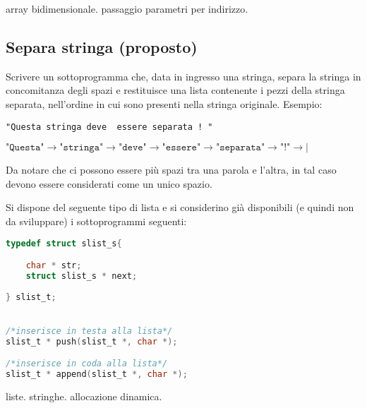 \begin{tags}
array bidimensionale. passaggio parametri per indirizzo.
\end{tags}



\subsection{Separa stringa (proposto)}

Scrivere un sottoprogramma che, data in ingresso una stringa, separa la stringa in concomitanza degli spazi e restituisce una lista contenente i pezzi della stringa separata, nell'ordine in cui sono presenti nella stringa originale.
Esempio: 
\begin{verbatim}
"Questa stringa deve  essere separata ! "
\end{verbatim}

$\texttt{"Questa"} \rightarrow \texttt{"stringa"} \rightarrow \texttt{"deve"} \rightarrow \texttt{"essere"} \rightarrow \texttt{"separata"} \rightarrow \texttt{"!"} \rightarrow \texttt{|}$


Da notare che ci possono essere pi\`u spazi tra una parola e l'altra, in tal caso devono essere considerati come un unico spazio.

Si dispone del seguente tipo di lista e si considerino gi\`a disponibili (e quindi non da sviluppare) i sottoprogrammi seguenti:

\begin{lstlisting}[language=c]
typedef struct slist_s{

    char * str;
    struct slist_s * next;
    
} slist_t;


/*inserisce in testa alla lista*/
slist_t * push(slist_t *, char *);

/*inserisce in coda alla lista*/
slist_t * append(slist_t *, char *);
\end{lstlisting}

\begin{tags}
liste. stringhe. allocazione dinamica.
\end{tags}


